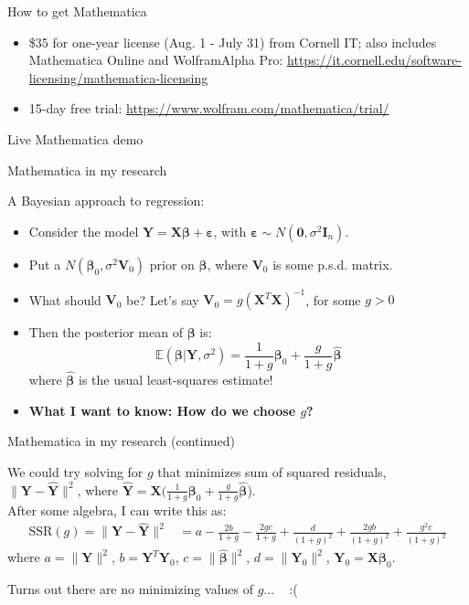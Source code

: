 \documentclass[dvipsnames]{beamer}
\let\b\mathbf
\let\bg\boldsymbol
\newcommand{\E}{\mathbb{E}}	%
\newcommand{\1}{\mathds{1}}	%
\begin{document}
\begin{frame}{How to get Mathematica}
\begin{itemize}
\item \$35 for one-year license (Aug. 1 - July 31) from Cornell IT; also includes Mathematica Online and WolframAlpha Pro: {\color{RoyalBlue}\url{https://it.cornell.edu/software-licensing/mathematica-licensing}}\\[1em]
\item 15-day free trial: {\color{RoyalBlue}\url{https://www.wolfram.com/mathematica/trial/}}
\end{itemize}
\end{frame}

\begin{frame}
\begin{center}\Large\color{titleText}Live Mathematica demo\end{center}	
\end{frame}

\begin{frame}{Mathematica in my research}

{\small A Bayesian approach to regression:
\begin{itemize}
\item Consider the model $\b Y = \b X\bg\beta + \bg\varepsilon$, with $\bg\varepsilon \sim N(\b 0,\sigma^2 \b I_n)$. 
\item Put a $N(\bg\beta_0,\sigma^2\b V_0)$ prior on $\bg\beta$, where $\b V_0$ is some p.s.d. matrix. \pause
\item What should $\b V_0$ be? Let's say $\b V_0 = g(\b X^T \b X)^{-1}$, for some $g>0$
\item Then the posterior mean of $\bg\beta$ is:
$$\E(\bg\beta|\b Y,\sigma^2) = \frac{1}{1+g}\bg\beta_0 + \frac{g}{1+g}\bg{\hat\beta}$$
where $\bg{\hat\beta}$ is the usual least-squares estimate! \pause
\item \textbf{What I want to know: How do we choose $g$?}
\end{itemize}}
\end{frame}

\begin{frame}{Mathematica in my research (continued)}

{\small We could try solving for $g$ that minimizes sum of squared residuals,\\[.5em] $\|\b Y - \b{\hat Y}\|^2$, where $\b{\hat Y} = \b X(\frac{1}{1+g}\bg\beta_0+\frac{g}{1+g}\bg{\hat\beta}$).\\[1em]

After some algebra, I can write this as:
{\scriptsize\begin{align*}
\text{SSR}(g)=\|\b Y - \b{\hat Y}\|^2 &= a-\frac{2b}{1+g}-\frac{2gc}{1+g}+\frac{d}{(1+g)^2}+\frac{2gb}{(1+g)^2}+\frac{g^2c}{(1+g)^2}
\end{align*}}
where $a=\|\b Y\|^2$, $b=\b Y^T\b Y_0$, $c=\|\bg{\hat\beta}\|^2$, $d=\|\b Y_0\|^2$, $\b Y_0 = \b X\bg\beta_0$.
\begin{figure}[H]
\centering{}	
\end{figure}
Turns out there are no minimizing values of $g$... ~ :(
}
\end{frame}
\end{document}
